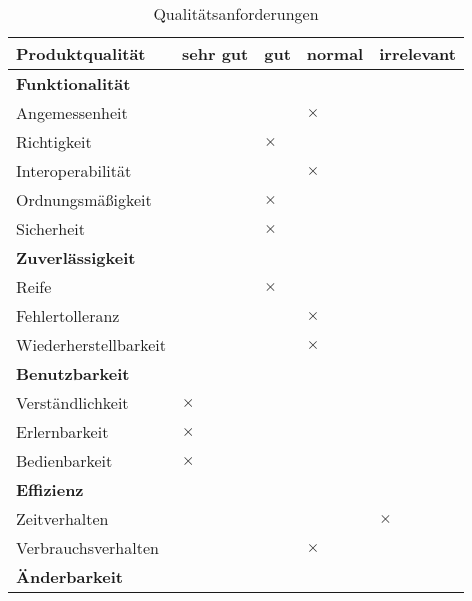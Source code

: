 \begin{table}[htbp]
	\centering
	\caption{Qualitätsanforderungen}
	\begin{tabular}{|l|p{2cm}|p{2cm}|p{2cm}|p{2cm}|}
		\hline
		\rowcolor{lightgray} \textbf{Produktqualität}       & \centering \textbf{sehr gu}t & \centering \textbf{gut}      & \centering \textbf{normal}   & \textbf{irrelevant} \\ \hline
		\multicolumn{5}{|l|}{\textbf{Funktionalität}}                           \\ \hline
		\quad Angemessenheit        &          &          & $\times$ &  \\ \hline
		\quad Richtigkeit           &          & \centering $\times$ &          &  \\ \hline
		\quad Interoperabilität     &          &          & $\times$ &  \\ \hline
		\quad Ordnungsmäßigkeit     &          & $\times$ &          &  \\ \hline
		\quad Sicherheit            &          & $\times$ &          &  \\ \hline
		\multicolumn{5}{|l|}{\textbf{Zuverlässigkeit}}                          \\ \hline
		\quad Reife                 &          & $\times$ &          &  \\ \hline
		\quad Fehlertolleranz       &          &          & $\times$ &  \\ \hline
		\quad Wiederherstellbarkeit &          &          & $\times$ &  \\ \hline
		\multicolumn{5}{|l|}{\textbf{Benutzbarkeit}}                            \\ \hline
		\quad Verständlichkeit      & $\times$ &          &          &  \\ \hline
		\quad Erlernbarkeit         & $\times$ &          &          &  \\ \hline
		\quad Bedienbarkeit         & $\times$ &          &          &  \\ \hline
		\multicolumn{5}{|l|}{\textbf{Effizienz}}                                \\ \hline
		\quad Zeitverhalten         &          &          &          & $\times$       \\ \hline
		\quad Verbrauchsverhalten   &          &          & $\times$ &  \\ \hline
		\multicolumn{5}{|l|}{\textbf{Änderbarkeit}}                             \\ \hline

\end{tabular}
\end{table}
